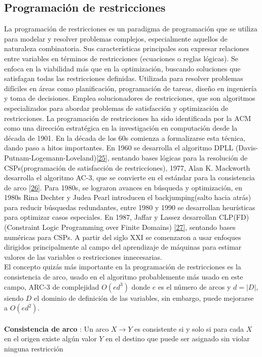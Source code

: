     \subsection*{ \Large Programación de restricciones}

La programación de restricciones es un paradigma de programación que se utiliza para modelar y resolver problemas complejos, especialmente aquellos de naturaleza
combinatoria. Sus características principales son expresar relaciones entre variables en términos de restricciones (ecuaciones o reglas lógicas). Se enfoca en la
viabilidad más que en la optimización, buscando soluciones que satisfagan todas las restricciones definidas. Utilizada para resolver problemas difíciles en áreas
como planificación, programación de tareas, diseño en ingeniería y toma de decisiones. Emplea solucionadores de restricciones, que son algoritmos especializados
para abordar problemas de satisfacción y optimización de restricciones. La programación de restricciones ha sido identificada por la ACM como una dirección estratégica
en la investigación en computación desde la década de 1901. En la década de los 60s comienza a formalizarse esta técnica, dando paso a hitos importantes. En 1960
se desarrolla el algoritmo DPLL (Davis-Putnam-Logemann-Loveland)\hyperref[sec:35]{[25]}, sentando bases lógicas para la resolución de CSPs(programación de satisfacción de restricciones), 1977, Alan K. Mackworth
desarrolla el algoritmo AC-3, que se convierte en el estándar para la consistencia de arco \hyperref[sec:36]{[26]}. Para 1980s, se lograron avances en búsqueda y optimización, en 1980s Rina
Dechter y Judea Pearl introducen el backjumping(salto hacia atrás) para reducir búsquedas redundantes, entre 1980 y 1990 se desarrollan heurísticas para optimizar
casos especiales. En 1987, Jaffar y Lassez desarrollan CLP(FD) (Constraint Logic Programming over Finite Domains) \hyperref[sec:37]{[27]}, sentando bases numéricas para CSPs. A partir del siglo XXI se comenzaron a usar
enfoques dirigidos principalmente al campo del aprendizaje de máquinas para estimar valores de las variables o restricciones innecesarias. \\

El concepto quizás más importante en la programación de restricciones es la consistencia de arco, usado en el algoritmo probablemente más usado en este campo, ARC-3 de complejidad $O(ed^3)$ donde $e$ es el número de arcos y $d=|D|$, siendo $D$ el dominio de definición de las variables, sin embargo, puede mejorarse a $O(ed^2)$. \\ \\
\textbf{ Consistencia de arco }: Un arco $X \rightarrow Y$ es consistente si y solo si para cada $X$ en el origen existe algún valor $Y$ en el destino que puede ser asignado sin violar ninguna restricción \\

